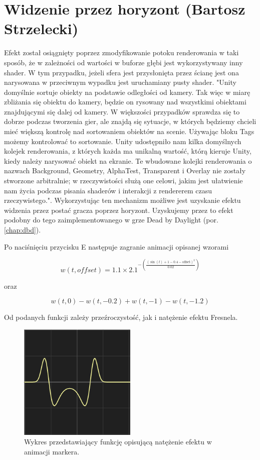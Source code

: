 \section{Widzenie przez horyzont (Bartosz Strzelecki)}
Efekt został osiągnięty poprzez zmodyfikowanie potoku renderowania w taki sposób, że w zależności od wartości w buforze głębi jest wykorzystywany inny shader.
W tym przypadku, jeżeli sfera jest przysłonięta przez ścianę jest ona narysowana w przeciwnym wypadku jest uruchamiany pusty shader.
"Unity domyślnie sortuje obiekty na podstawie odległości od kamery. Tak więc
w miarę zbliżania się obiektu do kamery, będzie on rysowany nad wszystkimi obiektami znajdującymi się dalej od kamery.
W większości przypadków sprawdza się to dobrze podczas tworzenia gier, ale
znajdą się sytuacje, w których będziemy chcieli mieć większą kontrolę nad sortowaniem obiektów na scenie. Używając bloku Tags{} możemy kontrolować to sortowanie.
Unity udostępniło nam kilka domyślnych kolejek renderowania, z których każda ma unikalną wartość, którą
kieruje Unity, kiedy należy narysować obiekt na ekranie. Te wbudowane kolejki renderowania
o nazwach Background, Geometry, AlphaTest, Transparent i Overlay nie zostały stworzone arbitralnie; w rzeczywistości służą one celowi, jakim jest ułatwienie nam życia podczas
pisania shaderów i interakcji z rendererem czasu rzeczywistego."\cite{shaderscookbook}. Wykorzystując ten mechanizm
możliwe jest uzyskanie efektu widzenia przez postać gracza poprzez horyzont. Uzyskujemy przez to efekt podobny do tego zaimplementowanego w grze Dead by Daylight (por. \ref{chap:dbd}).

Po naciśnięciu przycisku E następuje zagranie animacji opisanej wzorami 

\begin{equation}
w(t, offset) = 1.1 \times 2.1^{-\left(\frac{{\left(\sin(t) + 1 - 0.4 - \text{{offset}}\right)^2}}{{0.02}}\right)}
\end{equation}

oraz

\begin{equation}
w(t, 0) - w(t, -0.2) + w(t, -1) - w(t, -1.2)
\end{equation}

Od podanych funkcji zależy przeźroczystość, jak i natężenie efektu Fresnela. 

\begin{figure}[h]
    \centering
    \includegraphics[width=0.5\textwidth]{images/g}
    \caption{Wykres przedstawiający funkcję opisującą natężenie efektu w animacji markera.}
\end{figure}



